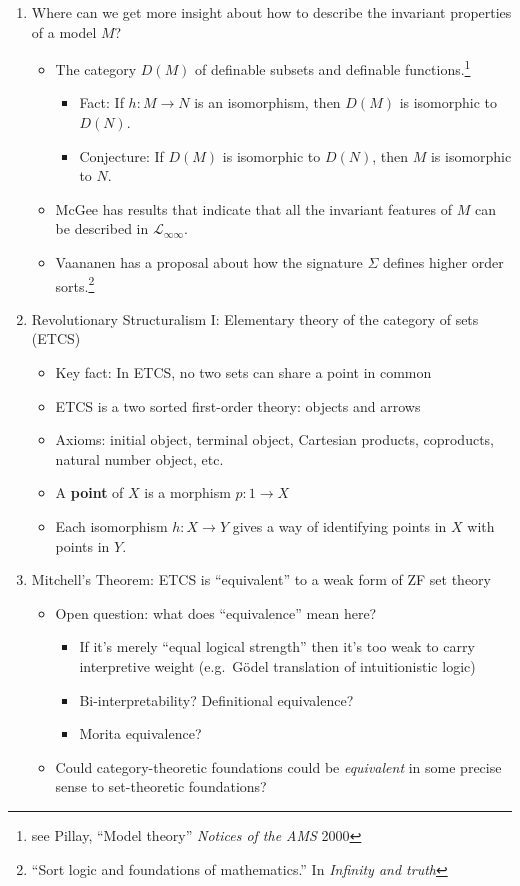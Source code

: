\documentclass[fleqn]{tufte-handout}
\begin{document}
\begin{enumerate}
\item Where can we get more insight about how to describe the
  invariant properties of a model $M$?
  \begin{itemize}
  \item The category $D(M)$ of definable subsets and definable
    functions.\footnote{see Pillay, ``Model theory'' \emph{Notices of
        the AMS} 2000}
    \begin{itemize}
      \item Fact: If $h:M\to N$ is an isomorphism, then $D(M)$ is
        isomorphic to $D(N)$.
      \item Conjecture: If $D(M)$ is isomorphic to $D(N)$, then $M$ is
        isomorphic to $N$.
    \end{itemize}
  \item McGee has results that indicate that all the invariant
    features of $M$ can be described in $\mathscr{L}_{\infty\infty}$.
  \item Vaananen has a proposal about how the signature $\Sigma$
    defines higher order sorts.\footnote{``Sort logic and foundations
      of mathematics.'' In \emph{Infinity and truth}}
  \end{itemize}

\item Revolutionary Structuralism I: Elementary theory of the category
  of sets (ETCS)

  \begin{itemize}
  \item Key fact: In ETCS, no two sets can share a point in common
  \item ETCS is a two sorted first-order theory: objects and arrows
  \item Axioms: initial object, terminal object, Cartesian products,
    coproducts, natural number object, etc.
  \item A \textbf{point} of $X$ is a morphism $p:1\to X$
  \item Each isomorphism $h:X\to Y$ gives a way of identifying points
    in $X$ with points in $Y$.
  \end{itemize}

\item Mitchell's Theorem: ETCS is ``equivalent'' to a weak form of ZF
  set theory

  \begin{itemize}
  \item Open question: what does ``equivalence'' mean here?
  \begin{itemize}
  \item If it's merely ``equal logical strength'' then it's too weak
    to carry interpretive weight (e.g.\ G\"odel translation of
    intuitionistic logic)
  \item Bi-interpretability? Definitional equivalence?
  \item Morita equivalence?
  \end{itemize}
\item Could category-theoretic foundations could be \emph{equivalent}
  in some precise sense to set-theoretic foundations?
\end{itemize}

\end{enumerate}
\end{document}
